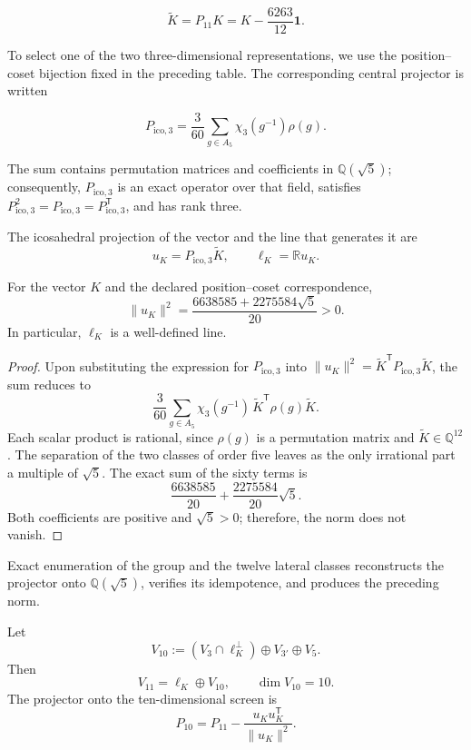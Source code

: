 \[
\widetilde K=P_{11}K
=K-\frac{6263}{12}\mathbf1.
\]

To select one of the two three-dimensional representations, we use the
position--coset bijection fixed in the preceding table. The corresponding central
projector is written

\[
P_{\mathrm{ico},3}=\frac{3}{60}\sum_{g\in A_5}\chi_3(g^{-1})\rho(g).
\]

The sum contains permutation matrices and coefficients in
\(\mathbb Q(\sqrt5)\); consequently, \(P_{\mathrm{ico},3}\) is an exact operator over
that field, satisfies \(P_{\mathrm{ico},3}^2=P_{\mathrm{ico},3}=P_{\mathrm{ico},3}^{\mathsf T}\), and has rank three.

\begin{definition}
The icosahedral projection of the vector and the line that generates it are
\[
u_K=P_{\mathrm{ico},3}\widetilde K,
\qquad
\ell_K=\mathbb R u_K.
\]
\end{definition}

\begin{lemma}
\label{lem:norma-uk}
For the vector \(K\) and the declared position--coset correspondence,
\[
\|u_K\|^2
=\frac{6638585+2275584\sqrt5}{20}>0.
\]
In particular, \(\ell_K\) is a well-defined line.
\end{lemma}

\begin{proof}
Upon substituting the expression for \(P_{\mathrm{ico},3}\) into
\(\|u_K\|^2=\widetilde K^{\mathsf T}P_{\mathrm{ico},3}\widetilde K\), the sum reduces to
\[
\frac3{60}\sum_{g\in A_5}
\chi_3(g^{-1})\,
\widetilde K^{\mathsf T}\rho(g)\widetilde K.
\]
Each scalar product is rational, since \(\rho(g)\) is a
permutation matrix and \(\widetilde K\in\mathbb Q^{12}\). The separation of the two
classes of order five leaves as the only irrational part a multiple of
\(\sqrt5\). The exact sum of the sixty terms is
\[
\frac{6638585}{20}+\frac{2275584}{20}\sqrt5.
\]
Both coefficients are positive and \(\sqrt5>0\); therefore, the norm does not
vanish.
\end{proof}

Exact enumeration of the group and the twelve lateral classes reconstructs
the projector onto \(\mathbb Q(\sqrt5)\), verifies its idempotence, and produces the
preceding norm.

\begin{theorem}
\label{thm:once-diez}
Let
\[
V_{10}:=(V_3\cap\ell_K^\perp)\oplus V_{3'}\oplus V_5.
\]
Then
\[
V_{11}=\ell_K\oplus V_{10},
\qquad
\dim V_{10}=10.
\]
The projector onto the ten-dimensional screen is
\[
P_{10}=P_{11}-\frac{u_Ku_K^{\mathsf T}}{\|u_K\|^2}.
\]
\end{theorem}

